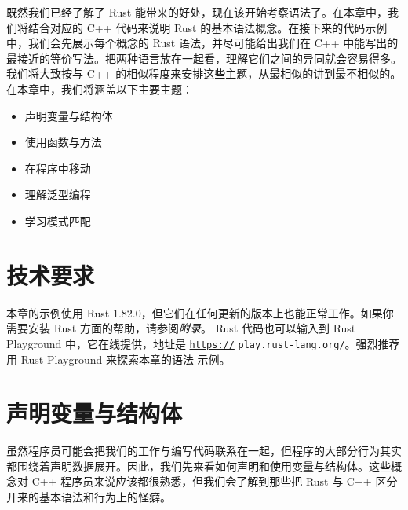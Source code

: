 既然我们已经了解了 Rust 能带来的好处，现在该开始考察语法了。在本章中，我们将结合对应的 C++ 代码来说明 Rust 的基本语法概念。在接下来的代码示例中，我们会先展示每个概念的 Rust 语法，并尽可能给出我们在 C++ 中能写出的最接近的等价写法。把两种语言放在一起看，理解它们之间的异同就会容易得多。
我们将大致按与 C++ 的相似程度来安排这些主题，从最相似的讲到最不相似的。
在本章中，我们将涵盖以下主要主题：
\begin{itemize}
  \item 声明变量与结构体
  \item 使用函数与方法
  \item 在程序中移动
  \item 理解泛型编程
  \item 学习模式匹配
\end{itemize}
\section{技术要求}
本章的示例使用 Rust 1.\allowbreak{}82.\allowbreak{}0，但它们在任何更新的版本上也能正常工作。如果你需要安装 Rust 方面的帮助，请参阅\emph{附录}。
Rust 代码也可以输入到 Rust Playground 中，它在线提供，地址是 \href{https://}{\texttt{https://}}
\texttt{play.\allowbreak{}rust-\allowbreak{}lang.\allowbreak{}org/\allowbreak{}}。强烈推荐用 Rust Playground 来探索本章的语法
示例。
\section{声明变量与结构体}
\label{idx:idx_c2f446fb}
\label{idx:idx_b6810211}
虽然程序员可能会把我们的工作与编写代码联系在一起，但程序的大部分行为其实都围绕着声明数据展开。因此，我们先来看如何声明和使用变量与结构体。这些概念对 C++ 程序员来说应该都很熟悉，但我们会了解到那些把 Rust 与 C++ 区分开来的基本语法和行为上的怪癖。
